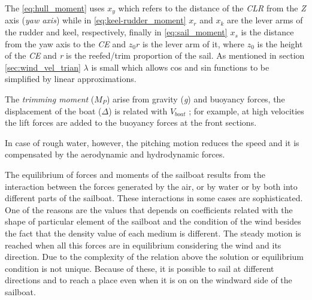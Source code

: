 The \ref{eq:hull_moment} uses $x_{y}$ which refers to the distance of the \textit{CLR} from the \textit{Z} axis (\textit{yaw axis}) while in \ref{eq:keel-rudder_moment} $x_{r}$ and $x_{k}$ are the lever arms of the rudder and keel, respectively, finally in \ref{eq:sail_moment} $x_{s}$ is the distance from the yaw axis to the \textit{CE} and $z_{0}r$ is the lever arm of it, where $z_{0}$ is the height of the \textit{CE}  and \textit{r} is the reefed/trim proportion of the sail. As mentioned in section \ref{sec:wind_vel_trian} $\lambda$ is small which allows cos and sin functions to be simplified by linear approximations. \par 
The \textit{trimming moment} ($M_{P}$) arise from gravity (\textit{g}) and buoyancy forces, the displacement of the boat (\textit{$\Delta$}) is related with $V_{boat}$ ; for example, at high velocities the lift forces are added to the buoyancy forces at the front sections. 

In case of rough water, however, the pitching motion reduces the speed and it is compensated by the aerodynamic and hydrodynamic forces\cite{claughton1998sailing}.\par 

The equilibrium of forces and moments of the sailboat results from the interaction between the forces generated by the air, or by  water or by both into different parts of the sailboat. These interactions in some cases are sophisticated. One of the reasons are the values that depends on coefficients related with the shape of particular element of the sailboat and the condition of the wind besides the fact that the density value of each medium is different. The steady motion is reached when all this forces are in equilibrium considering the wind and its direction. Due to the complexity of the relation above the solution or equilibrium condition is not unique. Because of these, it is possible to sail at different directions and to reach a place even when it is on on the windward side of the sailboat. 
